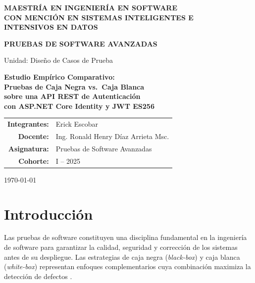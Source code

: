 \documentclass[11pt,a4paper]{article}
\begin{document}
\begin{titlepage}
    \centering
    \vspace*{1.5cm}
    {\Large\bfseries MAESTRÍA EN INGENIERÍA EN SOFTWARE\\
    CON MENCIÓN EN SISTEMAS INTELIGENTES E\\
    INTENSIVOS EN DATOS\par}
    \vspace{1.5cm}
    {\Large\bfseries PRUEBAS DE SOFTWARE AVANZADAS\par}
    \vspace{0.4cm}
    {\large Unidad: Diseño de Casos de Prueba\par}
    \vspace{1.2cm}
    {\LARGE\bfseries Estudio Empírico Comparativo:\\[0.2em]
    Pruebas de Caja Negra vs.\ Caja Blanca\\[0.2em]
    sobre una API REST de Autenticación\\
    con ASP.NET Core Identity y JWT ES256\par}
    \vfill
    {\large
    \begin{tabular}{rl}
        \textbf{Integrantes:}  & Erick Escobar \\
        \textbf{Docente:}      & Ing. Ronald Henry Díaz Arrieta Msc. \\[0.4em]
        \textbf{Asignatura:}   & Pruebas de Software Avanzadas \\[0.4em]
        \textbf{Cohorte:}      & I -- 2025 \\
    \end{tabular}\par}
    \vspace{2cm}
    {\large \today\par}
\end{titlepage}

\newpage
\tableofcontents
\newpage

\section{Introducción}

Las pruebas de software constituyen una disciplina fundamental en la ingeniería de software para garantizar la calidad, seguridad y corrección de los sistemas antes de su despliegue. Las estrategias de caja negra (\textit{black-box}) y caja blanca (\textit{white-box}) representan enfoques complementarios cuya combinación maximiza la detección de defectos \cite{myers2011art}.
\end{document}
